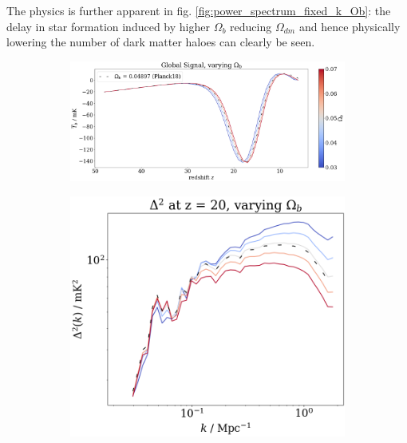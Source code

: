 \documentclass[floats,floatfix,showpacs,amssymb,prd,superscriptaddress,nofootinbib]{revtex4-2} %
\begin{document}
The physics is further apparent in fig. \ref{fig:power_spectrum_fixed_k_Ob}: the delay in star formation induced by higher $\Omega_b$ reducing $\Omega_{dm}$ and hence physically lowering the number of dark matter haloes can clearly be seen. 

\begin{figure}[H]
     \centering
     \begin{subfigure}[b]{0.9\textwidth}
         \centering
         \includegraphics[width=\textwidth]{images/simulation_results/global_signal_Ob.png}
         \label{fig:global_signal_Ob}
     \end{subfigure}
     \hfill
     \begin{subfigure}[b]{0.45\textwidth}
         \centering
         \includegraphics[width=\textwidth]{images/simulation_results/power_spectrum_fixed_z_20_Ob.png}
         \label{fig:power_spectrum_fixed_z_20_Ob}
     \end{subfigure}

\end{figure}
\end{document}

